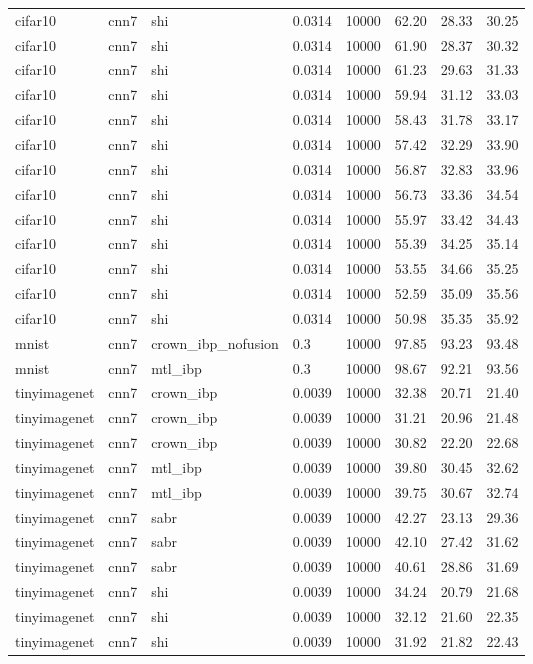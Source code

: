 \begin{tabular}{llllllll}
cifar10 & cnn7 & shi & 0.0314 & 10000 & 62.20 & 28.33 & 30.25 \\
cifar10 & cnn7 & shi & 0.0314 & 10000 & 61.90 & 28.37 & 30.32 \\
cifar10 & cnn7 & shi & 0.0314 & 10000 & 61.23 & 29.63 & 31.33 \\
cifar10 & cnn7 & shi & 0.0314 & 10000 & 59.94 & 31.12 & 33.03 \\
cifar10 & cnn7 & shi & 0.0314 & 10000 & 58.43 & 31.78 & 33.17 \\
cifar10 & cnn7 & shi & 0.0314 & 10000 & 57.42 & 32.29 & 33.90 \\
cifar10 & cnn7 & shi & 0.0314 & 10000 & 56.87 & 32.83 & 33.96 \\
cifar10 & cnn7 & shi & 0.0314 & 10000 & 56.73 & 33.36 & 34.54 \\
cifar10 & cnn7 & shi & 0.0314 & 10000 & 55.97 & 33.42 & 34.43 \\
cifar10 & cnn7 & shi & 0.0314 & 10000 & 55.39 & 34.25 & 35.14 \\
cifar10 & cnn7 & shi & 0.0314 & 10000 & 53.55 & 34.66 & 35.25 \\
cifar10 & cnn7 & shi & 0.0314 & 10000 & 52.59 & 35.09 & 35.56 \\
cifar10 & cnn7 & shi & 0.0314 & 10000 & 50.98 & 35.35 & 35.92 \\
mnist & cnn7 & crown\_ibp\_nofusion & 0.3 & 10000 & 97.85 & 93.23 & 93.48 \\
mnist & cnn7 & mtl\_ibp & 0.3 & 10000 & 98.67 & 92.21 & 93.56 \\
tinyimagenet & cnn7 & crown\_ibp & 0.0039 & 10000 & 32.38 & 20.71 & 21.40 \\
tinyimagenet & cnn7 & crown\_ibp & 0.0039 & 10000 & 31.21 & 20.96 & 21.48 \\
tinyimagenet & cnn7 & crown\_ibp & 0.0039 & 10000 & 30.82 & 22.20 & 22.68 \\
tinyimagenet & cnn7 & mtl\_ibp & 0.0039 & 10000 & 39.80 & 30.45 & 32.62 \\
tinyimagenet & cnn7 & mtl\_ibp & 0.0039 & 10000 & 39.75 & 30.67 & 32.74 \\
tinyimagenet & cnn7 & sabr & 0.0039 & 10000 & 42.27 & 23.13 & 29.36 \\
tinyimagenet & cnn7 & sabr & 0.0039 & 10000 & 42.10 & 27.42 & 31.62 \\
tinyimagenet & cnn7 & sabr & 0.0039 & 10000 & 40.61 & 28.86 & 31.69 \\
tinyimagenet & cnn7 & shi & 0.0039 & 10000 & 34.24 & 20.79 & 21.68 \\
tinyimagenet & cnn7 & shi & 0.0039 & 10000 & 32.12 & 21.60 & 22.35 \\
tinyimagenet & cnn7 & shi & 0.0039 & 10000 & 31.92 & 21.82 & 22.43 \\
\bottomrule
\end{tabular}